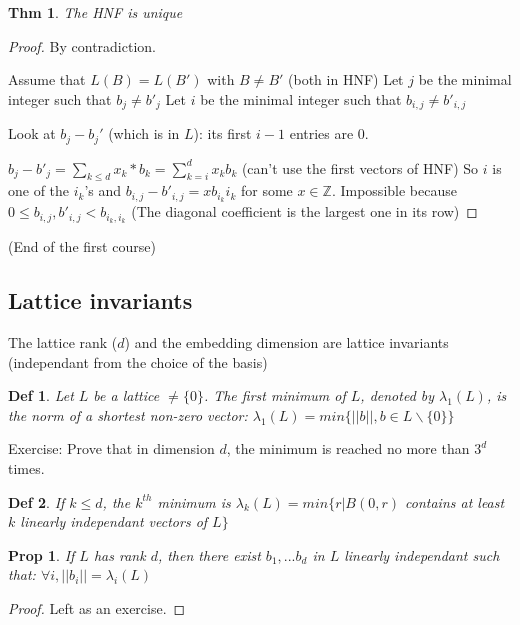 \documentclass[11pt]{article}
\newtheorem{definition}{Def}
\newtheorem{theorem}{Thm}
\newtheorem{proposition}{Prop}
\begin{document}
\begin{theorem}
The HNF is unique
\end{theorem}
\begin{proof}
By contradiction.

Assume that $L(B)=L(B')$ with $B \neq B'$ (both in HNF)
Let $j$ be the minimal integer such that $b_j \neq b'_j$
Let $i$ be the minimal integer such that $b_{i,j} \neq b'_{i,j}$

Look at $b_j-b_j'$ (which is in $L$): its first $i-1$ entries are $0$. 

$b_j-b'_j = \sum_{k \leq d} x_k*b_k = \sum_{k=i}^d x_k b_k$ (can't use the first vectors of HNF)
So $i$ is one of the $i_k$'s and $b_{i,j}-b'_{i,j}=x b_{i_k} i_k$ for some $x \in \mathbb{Z}$.
Impossible because $0 \leq b_{i,j}, b'_{i,j} < b_{i_k,i_k}$ (The diagonal coefficient is the largest one in its row)
\end{proof}

(End of the first course)

\subsection{Lattice invariants}

The lattice rank ($d$) and the embedding dimension are lattice invariants (independant from the choice of the basis)

\begin{definition}
Let $L$ be a lattice $\neq \{ 0 \}$. The first minimum of $L$, denoted by $\lambda_1 (L)$, is the norm of a shortest non-zero vector: $\lambda_1(L)=min\{||b||, b \in L \backslash \{ 0 \}\}$
\end{definition}

Exercise: Prove that in dimension $d$, the minimum is reached no more than $3^d$ times.

\begin{definition}
If $k \leq d$, the $k^{th}$ minimum is $\lambda_k(L)=min\{r | B(0,r)$ contains at least $k$ linearly independant vectors of $L \}$
\end{definition}

\begin{proposition}
If $L$ has rank $d$, then there exist $b_1,...b_d$ in $L$ linearly independant such that: $\forall i, ||b_i||=\lambda_i(L)$
\end{proposition}

\begin{proof}
Left as an exercise.
\end{proof}
\end{document}
